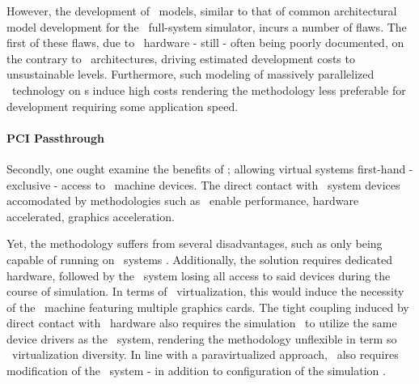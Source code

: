 However, the development of \dvttermgpu\ models, similar to that of common architectural model development for the \dvttermsimics\ full-system simulator, incurs a number of flaws.
The first of these flaws, due to \dvttermgpu\ hardware - still - often being poorly documented, on the contrary to \dvttermcpu\ architectures, driving estimated development costs to unsustainable levels.
Furthermore, such modeling of massively parallelized \dvttermgpu\ technology on \dvttermcpu s induce high costs rendering the methodology less preferable for development requiring some application speed.

\paragraph{PCI Passthrough}
\label{par:background_graphicsvirtualization_pcipassthrough}
Secondly, one ought examine the benefits of \dvttermpcipassthrough ; allowing virtual systems first-hand - exclusive - access to \dvttermhost\ machine devices.
The direct contact with \dvttermhost\ system devices accomodated by methodologies such as \dvttermpcipassthrough\ enable performance, hardware accelerated, graphics acceleration.

Yet, the methodology suffers from several disadvantages, such as only being capable of running on \dvttermlinux\ systems .
Additionally, the solution requires dedicated hardware, followed by the \dvttermhost\ system losing all access to said devices during the course of simulation.
In terms of \dvttermgpu\ virtualization, this would induce the necessity of the \dvttermhost\ machine featuring multiple graphics cards.
The tight coupling induced by direct contact with \dvttermhost\ hardware also requires the simulation \dvttermtarget\ to utilize the same device drivers as the \dvttermhost\ system, rendering the methodology unflexible in term so \dvttermgpu\ virtualization diversity.
In line with a paravirtualized approach, \dvttermpcipassthrough\ also requires modification of the \dvttermtarget\ system - in addition to configuration of the simulation \dvttermhost .


